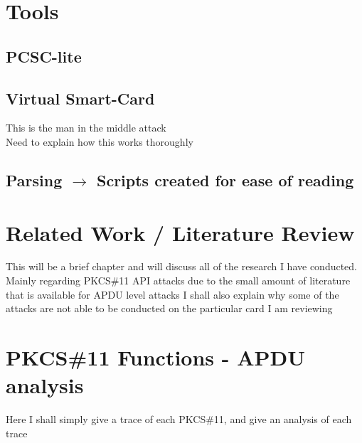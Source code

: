 \documentclass[bsc,frontabs,twoside,singlespacing,parskip,deptreport]{infthesis}     %
\begin{document}
\chapter{Tools}

\section{PCSC-lite}

\section{Virtual Smart-Card}
This is the man in the middle attack\\
Need to explain how this works thoroughly

\section{Parsing $\rightarrow$ Scripts created for ease of reading}







\chapter{Related Work / Literature Review}

This will be a brief chapter and will discuss all of the research I have conducted.\\
Mainly regarding PKCS\#11 API attacks due to the small amount of literature that is available for APDU level attacks
I shall also explain why some of the attacks are not able to be conducted on the particular card I am reviewing







\chapter{PKCS\#11 Functions - APDU analysis}

Here I shall simply give a trace of each PKCS\#11, and give an analysis of each trace
\end{document}
